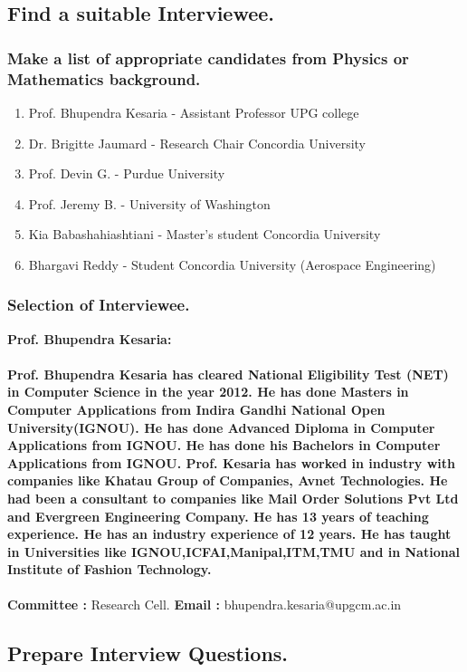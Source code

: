 \documentclass{article}
\begin{document}
\subsection{Find a suitable Interviewee.}
\subsubsection{Make a list of appropriate candidates from Physics or Mathematics background.}
\begin{enumerate}
    \item Prof. Bhupendra Kesaria - Assistant Professor UPG college
    \item Dr. Brigitte Jaumard - Research Chair Concordia University
    \item Prof. Devin G. - Purdue University
    \item Prof. Jeremy B. -  University of Washington
    \item Kia Babashahiashtiani - Master's student Concordia University
    \item Bhargavi Reddy - Student Concordia University (Aerospace Engineering)
\end{enumerate}
\subsubsection{Selection of Interviewee.}
\hfill \break
\textbf{Prof. Bhupendra Kesaria: }
\paragraph{Prof. Bhupendra Kesaria has cleared National Eligibility Test (NET) in Computer Science in the year 2012. He has done Masters in Computer Applications from Indira Gandhi National Open University(IGNOU). He has done Advanced Diploma in Computer Applications from IGNOU. He has done his Bachelors in Computer Applications from IGNOU. Prof. Kesaria has worked in industry with companies like Khatau Group of Companies, Avnet Technologies. He had been a consultant to companies like Mail Order Solutions Pvt Ltd and Evergreen Engineering Company. He has 13 years of teaching experience. He has an industry experience of 12 years. He has taught in Universities like IGNOU,ICFAI,Manipal,ITM,TMU and in National Institute of Fashion Technology.}
\hfill \break
\hfill \break
\textbf{Committee :}  Research Cell.
\hfill \break
\hfill \break
\textbf{Email :}  bhupendra.kesaria@upgcm.ac.in
\newpage

\subsection{Prepare Interview Questions.}
\hfill \break
\end{document}

